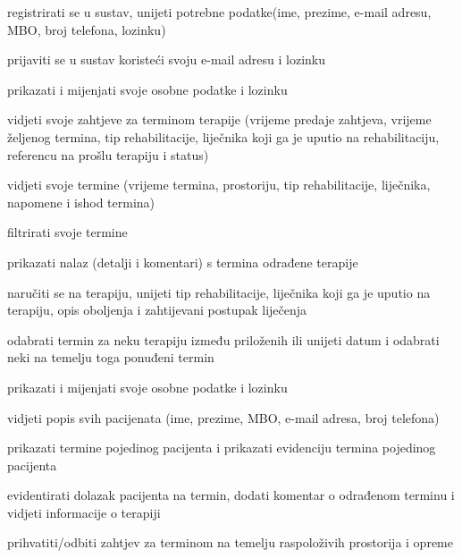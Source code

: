 			
			\begin{packed_enum}
				\item  {}
				\begin{packed_enum}
					\item registrirati se u sustav, unijeti potrebne podatke(ime, prezime, e-mail adresu, MBO, broj telefona, lozinku)
				\end{packed_enum}
			
				\item  {}
				\begin{packed_enum}
					\item prijaviti se u sustav koristeći svoju e-mail adresu i lozinku
				\end{packed_enum}
				
				\item  {}
				\begin{packed_enum}
					\item prikazati i mijenjati svoje osobne podatke i lozinku
					\item vidjeti svoje zahtjeve za terminom terapije (vrijeme predaje zahtjeva, vrijeme željenog termina, tip rehabilitacije, liječnika koji ga je uputio na rehabilitaciju, referencu na prošlu terapiju i status) 
					\item vidjeti svoje termine (vrijeme termina, prostoriju, tip rehabilitacije, liječnika, napomene i ishod termina) 
					\item filtrirati svoje termine
					\item prikazati nalaz (detalji i komentari) s termina odrađene terapije
					\item naručiti se na terapiju, unijeti tip rehabilitacije, liječnika koji ga je uputio na terapiju, opis oboljenja i zahtijevani postupak liječenja
					\item odabrati termin za neku terapiju između priloženih ili unijeti datum i odabrati neki na temelju toga ponuđeni termin
				\end{packed_enum}
				
				\item  {}
				\begin{packed_enum}
					\item prikazati i mijenjati svoje osobne podatke i lozinku
					\item vidjeti popis svih pacijenata (ime, prezime, MBO, e-mail adresa, broj telefona)
					\item prikazati termine pojedinog pacijenta i prikazati evidenciju termina pojedinog pacijenta
					\item evidentirati dolazak pacijenta na termin, dodati komentar o odrađenom terminu i vidjeti informacije o terapiji
					\item prihvatiti/odbiti zahtjev za terminom na temelju raspoloživih prostorija i opreme 
					

\end{packed_enum}
\end{packed_enum}
